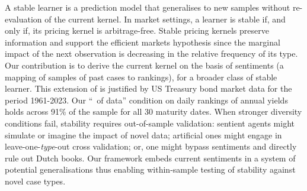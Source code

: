   A stable learner is a prediction model that generalises to new samples
  without re-evaluation of the current kernel.  In market settings, a learner
  is stable if, and only if, its pricing kernel is arbitrage-free.  Stable
  pricing kernels preserve information and support the efficient markets
  hypothesis since the marginal impact of the next observation is decreasing in
  the relative frequency of its type. Our contribution is to derive the current
  kernel on the basis of sentiments (a mapping of samples of past cases to
  rankings), for a broader class of stable learner.  This extension of
  \cite{GS_Inductive_inference} is justified by US Treasury bond market data
  for the period 1961-2023. Our ``\parthreediv\ of data'' condition on daily
    rankings of annual yields
  holds across 91\% of the sample for all 30 maturity dates.  When stronger
  diversity conditions fail, stability requires out-of-sample validation:
  sentient agents might simulate or imagine the impact of novel data;
  artificial ones might engage in leave-one-\emph{type}-out cross validation;
  or, one might bypass sentiments and directly rule out Dutch books. Our
  framework embeds current sentiments in a system of potential generalisations
  thus enabling within-sample testing of stability against novel case types.
%
